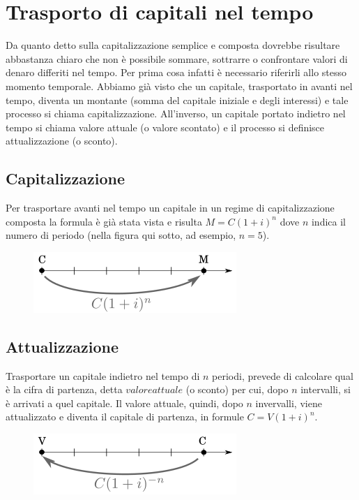 \section{Trasporto di capitali nel tempo} Da quanto detto sulla capitalizzazione 
semplice e composta dovrebbe risultare abbastanza chiaro che non è possibile 
sommare, sottrarre o confrontare valori di denaro differiti nel tempo. Per prima 
cosa infatti è necessario riferirli allo stesso momento temporale. Abbiamo già 
visto che un capitale, trasportato in avanti nel tempo, diventa un montante 
(somma del capitale iniziale e degli interessi) e tale processo si chiama 
capitalizzazione. All'inverso, un capitale portato indietro nel tempo si chiama 
valore attuale (o valore scontato) e il processo si definisce attualizzazione (o 
sconto). 


\subsection{Capitalizzazione} Per trasportare avanti nel tempo un capitale in un 
regime di capitalizzazione composta la formula è già stata vista e risulta 
$M=C(1+i)^n$ dove $n$ indica il numero di periodo (nella figura qui sotto, ad 
esempio, $n=5$).

\begin{figure}[htp] \centering 
\includegraphics[scale=.60]{img/capitalizzazione.png} \end{figure}


\subsection{Attualizzazione} Trasportare un capitale indietro nel tempo di $n$ 
periodi, prevede di calcolare qual è la cifra di partenza, detta $valore 
attuale$ (o sconto) per cui, dopo $n$ intervalli, si è arrivati a quel capitale. 
Il valore attuale, quindi, dopo $n$ invervalli, viene attualizzato e diventa il 
capitale di partenza, in formule $C=V(1+i)^n$. \begin{figure}[htp] \centering 
\includegraphics[scale=.60]{img/attualizzazione.png} \end{figure}

